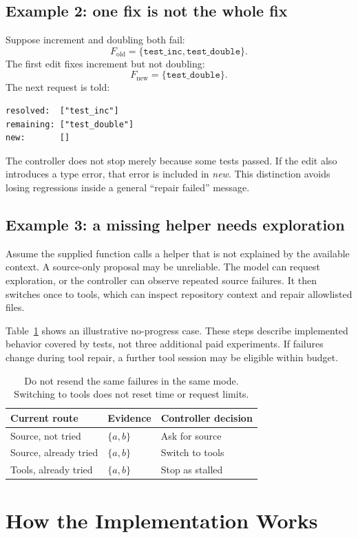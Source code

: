\documentclass[10pt,twocolumn,a4paper]{article}
\begin{document}
\subsection{Example 2: one fix is not the whole fix}
Suppose increment and doubling both fail:
\[
F_{\text{old}}=\{\texttt{test\_inc},\texttt{test\_double}\}.
\]
The first edit fixes increment but not doubling:
\[
F_{\text{new}}=\{\texttt{test\_double}\}.
\]
The next request is told:
\begin{lstlisting}
resolved:  ["test_inc"]
remaining: ["test_double"]
new:       []
\end{lstlisting}
The controller does not stop merely because some tests passed.
If the edit also introduces a type error, that error is included in
\emph{new}. This distinction avoids losing regressions inside a general
``repair failed'' message.

\subsection{Example 3: a missing helper needs exploration}
Assume the supplied function calls a helper that is not explained by the
available context. A source-only proposal may be unreliable. The model can
request exploration, or the controller can observe repeated source failures.
It then switches once to tools, which can inspect repository context and
repair allowlisted files.

Table~\ref{tab:fallback} shows an illustrative no-progress case. These steps
describe implemented behavior covered by tests, not three additional paid
experiments. If failures change during tool repair, a further tool session
may be eligible within budget.

\begin{table}[t]
\centering\small
\begin{tabular}{lll}
\toprule
Current route & Evidence & Controller decision\\
\midrule
Source, not tried & $\{a,b\}$ & Ask for source\\
Source, already tried & $\{a,b\}$ & Switch to tools\\
Tools, already tried & $\{a,b\}$ & Stop as stalled\\
\bottomrule
\end{tabular}
\caption{Do not resend the same failures in the same mode.
Switching to tools does not reset time or request limits.}
\label{tab:fallback}
\end{table}

\section{How the Implementation Works}
\end{document}
